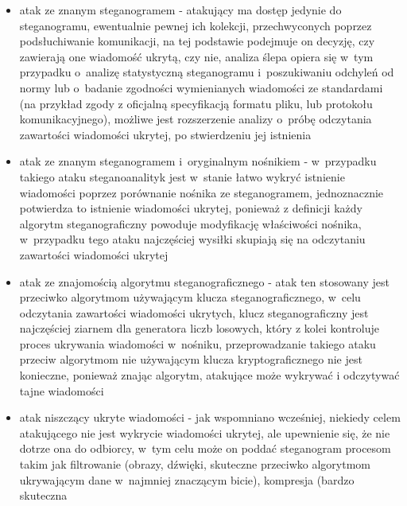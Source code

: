 \documentclass[a4paper, twoside, 12pt]{report}
\begin{document}
        \begin{itemize}
            \item atak ze znanym steganogramem - atakujący ma dostęp jedynie do
                steganogramu, ewentualnie pewnej ich kolekcji, przechwyconych poprzez
                podsłuchiwanie komunikacji, na tej podstawie podejmuje on decyzję,
                czy zawierają one wiadomość ukrytą, czy nie, analiza ślepa opiera
                się w~tym przypadku o~analizę statystyczną steganogramu i~poszukiwaniu
                odchyleń od normy lub o~badanie zgodności wymienianych wiadomości
                ze standardami (na przykład zgody z oficjalną specyfikacją formatu pliku,
                lub protokołu komunikacyjnego), możliwe jest rozszerzenie
                analizy o~próbę odczytania zawartości wiadomości ukrytej, po stwierdzeniu
                jej istnienia
            \item atak ze znanym steganogramem i~oryginalnym nośnikiem - w~przypadku
                takiego ataku steganoanalityk jest w~stanie łatwo wykryć istnienie
                wiadomości poprzez porównanie nośnika ze steganogramem, jednoznacznie
                potwierdza to istnienie wiadomości ukrytej, ponieważ z definicji
                każdy algorytm steganograficzny powoduje modyfikację właściwości
                nośnika, w~przypadku tego ataku najczęściej wysiłki skupiają się
                na odczytaniu zawartości wiadomości ukrytej
            \item atak ze znajomością algorytmu steganograficznego - atak ten
                stosowany jest przeciwko algorytmom używającym klucza steganograficznego,
                w~celu odczytania zawartości wiadomości ukrytych, klucz steganograficzny
                jest najczęściej ziarnem dla generatora liczb losowych, który z
                kolei kontroluje proces ukrywania wiadomości w~nośniku, przeprowadzanie
                takiego ataku przeciw algorytmom nie używającym klucza kryptograficznego
                nie jest konieczne, ponieważ znając algorytm, atakujące może wykrywać i
                odczytywać tajne wiadomości
            \item atak niszczący ukryte wiadomości - jak wspomniano wcześniej, niekiedy
                celem atakującego nie jest wykrycie wiadomości ukrytej, ale upewnienie
                się, że nie dotrze ona do odbiorcy, w~tym celu może on poddać steganogram
                procesom takim jak filtrowanie (obrazy, dźwięki, skuteczne przeciwko
                algorytmom ukrywającym dane w~najmniej znaczącym bicie), kompresja (bardzo skuteczna

\end{itemize}
\end{document}
